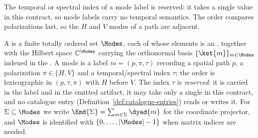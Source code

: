 
The temporal or spectral index of a mode label is reserved: it takes a single
value in this contract, so mode labels carry no temporal semantics. The order compares polarizations last,
so the $H$ and $V$ modes of a path are adjacent.

\begin{definition}\label{def:modes}
A  is a finite totally ordered set $\Modes$, each of
whose elements is an , together with the Hilbert space
$\mathbb{C}^{\Modes}$ carrying the orthonormal basis $\{\ket{m}\}_{m\in\Modes}$
indexed in the . A mode is a label $m=(p,\pi,\tau)$ recording a
spatial path $p$, a polarization $\pi\in\{H,V\}$ and a temporal/spectral index
$\tau$; the order is lexicographic in $(p,\tau,\pi)$ with $H$ before $V$. The
index $\tau$ is \emph{reserved}: it is carried in the label and in the emitted
artifact, it may take only a single  in this contract, and no
catalogue entry (Definition~\ref{def:catalogue-entries}) reads or writes it.
For $\Sigma\subseteq\Modes$ we write
$\Emd{\Sigma}=\sum_{m\in\Sigma}\dyad{m}$ for the coordinate projector, and
$\Modes$ is identified with $\{0,\dots,|\Modes|-1\}$ when matrix indices are
needed.
\end{definition}
